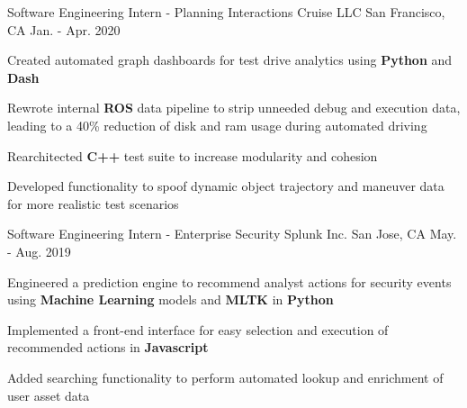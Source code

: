 


\begin{cventries}


\cventry
{Software Engineering Intern - Planning Interactions} %
{Cruise LLC} %
{San Francisco, CA} %
{Jan. - Apr. 2020} %
{ %
\begin{cvitems}
\item {Created automated graph dashboards for test drive analytics using {\bf Python} and {\bf Dash}}
\item {Rewrote internal {\bf ROS} data pipeline to strip unneeded debug and execution data, leading to a 40\% reduction of disk and ram usage during automated driving}
\item {Rearchitected {\bf C++} test suite to increase modularity and cohesion}
\item {Developed functionality to spoof dynamic object trajectory and maneuver data for more realistic test scenarios}
\end{cvitems}
}


\cventry
{Software Engineering Intern - Enterprise Security} %
{Splunk Inc.} %
{San Jose, CA} %
{May. - Aug. 2019} %
{ %
\begin{cvitems}
\item {Engineered a prediction engine to recommend analyst actions for security events using {\bf Machine Learning} models and {\bf MLTK} in {\bf Python}}
\item {Implemented a front-end interface for easy selection and execution of recommended actions in {\bf Javascript}}
\item {Added searching functionality to perform automated lookup and enrichment of user asset data}
\end{cvitems}
}


\end{cventries}
